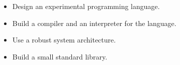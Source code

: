 \begin{slide}
    \begin{itemize}
        \item Design an experimental programming language.
        \item Build a compiler and an interpreter for the language.
        \item Use a robust system architecture.
        \item Build a small standard library.
    \end{itemize}
\end{slide}
